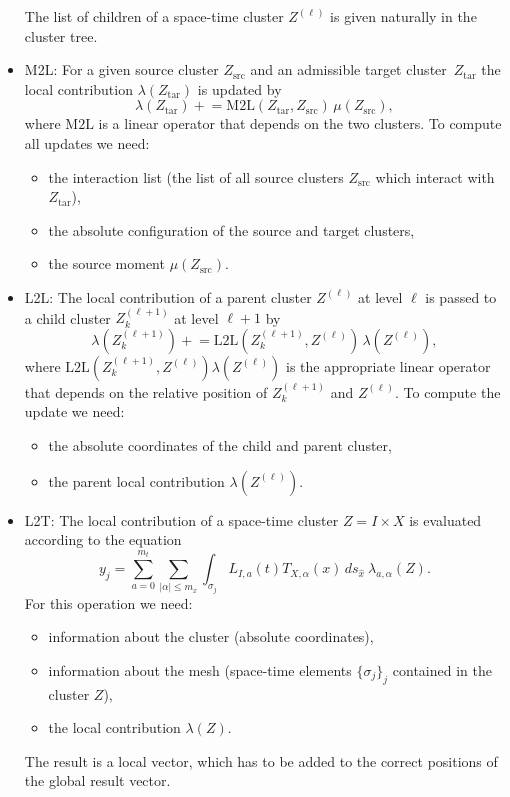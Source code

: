 \documentclass[a4paper,11pt]{article}
\theoremstyle{plain}
\theoremstyle{definition}
\theoremstyle{remark}
\newcommand{\pluseq}{\mathrel{+}=}
\begin{document}
\begin{itemize}
\begin{itemize}
    \end{itemize}
    The list of children of a space-time cluster $Z^{(\ell)}$ is given naturally in the cluster tree.
  \item M2L: For a given source cluster $Z_{\mathrm{src}}$ and an admissible target cluster~$Z_{\mathrm{tar}}$ the local
    contribution $\lambda(Z_{\mathrm{tar}})$ is updated by
    \begin{equation*}
      \lambda(Z_{\mathrm{tar}}) \pluseq \mathrm{M2L}(Z_{\mathrm{tar}}, Z_{\mathrm{src}})\, \mu(Z_{\mathrm{src}}),
    \end{equation*}
    where $\mathrm{M2L}$ is a linear operator that depends on the two clusters. To compute all updates we need:
    \begin{itemize}
      \item the interaction list (the list of all source clusters $Z_{\mathrm{src}}$ which interact with 
      $Z_{\mathrm{tar}}$),
      \item the absolute configuration of the source and target clusters,
      \item the source moment $\mu(Z_{\mathrm{src}})$.
    \end{itemize}
  \item L2L: The local contribution of a parent cluster $Z^{(\ell)}$ at level $\ell$ is passed to a child cluster 
  $Z_{k}^{(\ell+1)}$ at level $\ell+1$ by
  \begin{equation*}
    \lambda(Z_{k}^{(\ell+1)}) \pluseq \mathrm{L2L}(Z_{k}^{(\ell+1)},Z^{(\ell)})\, \lambda(Z^{(\ell)}),
  \end{equation*}
  where $\mathrm{L2L}(Z_{k}^{(\ell+1)},Z^{(\ell)}) \lambda(Z^{(\ell)})$ is the appropriate linear operator that depends on the relative position of $Z_{k}^{(\ell+1)}$ and $Z^{(\ell)}$. To compute the update we need:
  \begin{itemize}
    \item the absolute coordinates of the child and parent cluster,
    \item the parent local contribution $\lambda(Z^{(\ell)})$.
  \end{itemize}
  \item L2T: The local contribution of a space-time cluster $Z = I \times X$ is evaluated according to the equation 
    \begin{equation*}
      y_j = \sum_{a=0}^{m_t} \sum_{|\alpha|\leq m_x} 
        \int_{\sigma_j} L_{I,a}(t) T_{X,\alpha}(x) \,ds_{\hat{x}}\ \lambda_{a, \alpha}(Z).
    \end{equation*}
    For this operation we need:
    \begin{itemize}
      \item information about the cluster (absolute coordinates),
      \item information about the mesh (space-time elements $\{\sigma_j\}_j$ contained in the cluster $Z$),
      \item the local contribution $\lambda(Z)$.
    \end{itemize}
    The result is a local vector, which has to be added to the correct positions of the global result vector.
\end{itemize}
\end{document}
